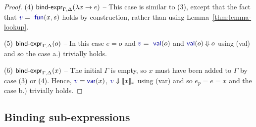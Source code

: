 \documentclass[english,crc]{programming}
\theoremstyle{plain}
\theoremstyle{definition}
\newcommand{\ident}[1]{\textnormal{\textcolor{idclr}{\sffamily #1}}}
\newcommand{\bndclr}[1]{\textcolor{kvdclr}{#1}}
\newcommand{\bnd}[1]{\textnormal{\textcolor{kvdclr}{\sffamily #1}}}
\newcommand{\rname}[1]{{\sffamily(#1)}}
\begin{document}
\begin{proof}
\vspace{0.75em}\noindent(4) $\ident{bind-expr}_{\Gamma, \Delta}(\lambda x\rightarrow e)$  --
  This case is similar to (3), except that the fact that $\bndclr{v} = \bnd{fun}(x, s)$
  holds by construction, rather than using Lemma~\ref{thm:lemma-lookup}.

\vspace{0.75em}\noindent(5) $\ident{bind-expr}_{\Gamma, \Delta}(o)$ -- In this case $e=o$ and $\bndclr{v} = \bnd{val}(o)$
  and $\bnd{val}(o)\Downarrow o$ using \rname{val} and so the case a.) trivially holds.

\vspace{0.75em}\noindent(6) $\ident{bind-expr}_{\Gamma, \Delta}(x)$ -- The initial $\Gamma$ is empty,
  so $x$ must have been added to $\Gamma$ by case (3) or (4). Hence,
  $\bndclr{v}=\bnd{var}(x)$, $\bndclr{v}\Downarrow \llbracket x \rrbracket_{x}$ using \rname{var}
  and so $e_p = e = x$ and the case b.) trivially holds.

\end{proof}

\subsection{Binding sub-expressions}
\label{sec:sub-expr}
\end{document}
